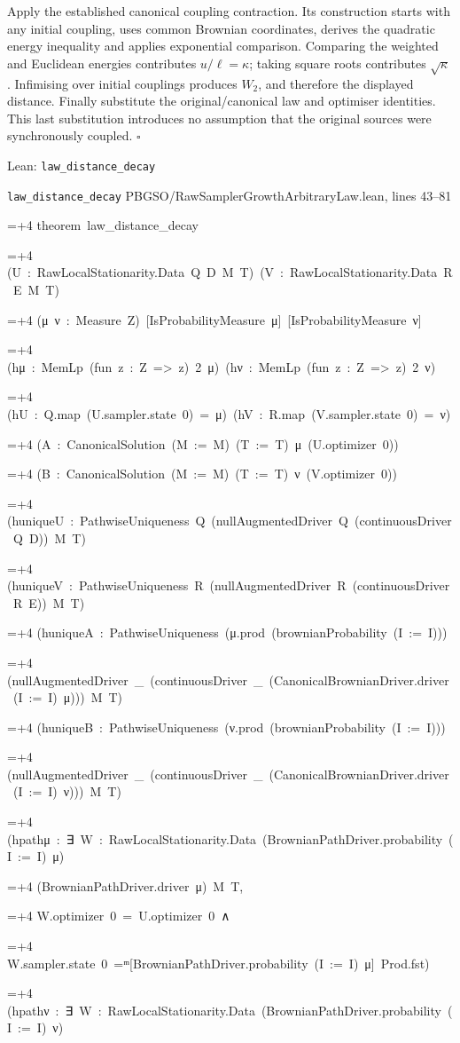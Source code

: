 \documentclass[11pt,a4paper]{report}
\newlength{\leancharwidth}
\newenvironment{leancode}{\par\smallskip\begingroup\ttfamily\footnotesize\raggedright
  \settowidth{\leancharwidth}{M}\setlength{\parskip}{0pt}\setlength{\parindent}{0pt}
  \frenchspacing}{\par\endgroup\smallskip}
\newcommand{\leanline}[2]{\hangindent=\dimexpr#1\leancharwidth+4\leancharwidth\relax
  \hangafter=1\noindent\hspace*{#1\leancharwidth}#2\par}
\newcommand{\leansource}[1]{\par{\footnotesize\color{leanmuted}#1}\par}
\begin{document}
Apply the established canonical coupling contraction. Its construction starts with any initial coupling, uses common Brownian coordinates, derives the quadratic energy inequality and applies exponential comparison. Comparing the weighted and Euclidean energies contributes \(u/\ell=\kappa\); taking square roots contributes \(\sqrt\kappa\). Infimising over initial couplings produces \(W_2\), and therefore the displayed distance. Finally substitute the original/\allowbreak{}canonical law and optimiser identities. This last substitution introduces no assumption that the original sources were synchronously coupled. \(\square\)

\begin{leanbox}{Lean: \texttt{law\_\allowbreak{}distance\_\allowbreak{}decay}}
\leansource{\texttt{law\_\allowbreak{}distance\_\allowbreak{}decay} \quad PBGSO/\allowbreak{}RawSamplerGrowthArbitraryLaw.lean, lines 43–81}
\begin{leancode}
\leanline{0}{theorem\ law\_distance\_decay}
\leanline{4}{(U\ :\ RawLocalStationarity.Data\ Q\ D\ M\ T)\ (V\ :\ RawLocalStationarity.Data\ R\ E\ M\ T)}
\leanline{4}{(μ\ ν\ :\ Measure\ Z)\ [IsProbabilityMeasure\ μ]\ [IsProbabilityMeasure\ ν]}
\leanline{4}{(hμ\ :\ MemLp\ (fun\ z\ :\ Z\ =>\ z)\ 2\ μ)\ (hν\ :\ MemLp\ (fun\ z\ :\ Z\ =>\ z)\ 2\ ν)}
\leanline{4}{(hU\ :\ Q.map\ (U.sampler.state\ 0)\ =\ μ)\ (hV\ :\ R.map\ (V.sampler.state\ 0)\ =\ ν)}
\leanline{4}{(A\ :\ CanonicalSolution\ (M\ :=\ M)\ (T\ :=\ T)\ μ\ (U.optimizer\ 0))}
\leanline{4}{(B\ :\ CanonicalSolution\ (M\ :=\ M)\ (T\ :=\ T)\ ν\ (V.optimizer\ 0))}
\leanline{4}{(huniqueU\ :\ PathwiseUniqueness\ Q\ (nullAugmentedDriver\ Q\ (continuousDriver\ Q\ D))\ M\ T)}
\leanline{4}{(huniqueV\ :\ PathwiseUniqueness\ R\ (nullAugmentedDriver\ R\ (continuousDriver\ R\ E))\ M\ T)}
\leanline{4}{(huniqueA\ :\ PathwiseUniqueness\ (μ.prod\ (brownianProbability\ (I\ :=\ I)))}
\leanline{6}{(nullAugmentedDriver\ \_\ (continuousDriver\ \_\ (CanonicalBrownianDriver.driver\ (I\ :=\ I)\ μ)))\ M\ T)}
\leanline{4}{(huniqueB\ :\ PathwiseUniqueness\ (ν.prod\ (brownianProbability\ (I\ :=\ I)))}
\leanline{6}{(nullAugmentedDriver\ \_\ (continuousDriver\ \_\ (CanonicalBrownianDriver.driver\ (I\ :=\ I)\ ν)))\ M\ T)}
\leanline{4}{(hpathμ\ :\ ∃\ W\ :\ RawLocalStationarity.Data\ (BrownianPathDriver.probability\ (I\ :=\ I)\ μ)}
\leanline{8}{(BrownianPathDriver.driver\ μ)\ M\ T,}
\leanline{6}{W.optimizer\ 0\ =\ U.optimizer\ 0\ ∧}
\leanline{6}{W.sampler.state\ 0\ =ᵐ[BrownianPathDriver.probability\ (I\ :=\ I)\ μ]\ Prod.fst)}
\leanline{4}{(hpathν\ :\ ∃\ W\ :\ RawLocalStationarity.Data\ (BrownianPathDriver.probability\ (I\ :=\ I)\ ν)}

\end{leancode}
\end{leanbox}
\end{document}
